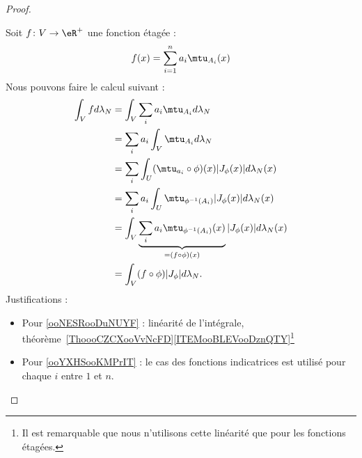 \begin{proof}
\begin{enumerate}
\begin{subproof}
                   Soit \( f\colon V\to \eR^+\) une fonction étagée :
                   \begin{equation}
                       f(x)=\sum_{i=1}^na_i\mtu_{A_i}(x)
                   \end{equation}
                   Nous pouvons faire le calcul suivant :
                   \begin{subequations}
                       \begin{align}
                           \int_Vfd\lambda_N&=\int_V\sum_ia_i\mtu_{A_i}d\lambda_N\\
                           &=\sum_ia_i\int_{V}\mtu_{A_i}d\lambda_N      \label{ooNESRooDuNUYF}\\
                           &=\sum_i\int_U(\mtu_{a_i}\circ\phi)(x)| J_{\phi}(x) |d\lambda_N(x)   \label{ooYXHSooKMPrIT}\\
                           &=\sum_ia_i\int_U\mtu_{\phi^{-1}(A_i)}| J_{\phi}(x) |d\lambda_N(x)\\
                           &=\int_V\underbrace{\sum_ia_i\mtu_{\phi^{-1}(A_i)}(x)}_{=(f\circ\phi)(x)}| J_{\phi}(x) |d\lambda_N(x)\\
                           &=\int_V(f\circ\phi)| J_{\phi} |d\lambda_N.
                       \end{align}
                   \end{subequations}
                   Justifications :
                   \begin{itemize}
                       \item Pour \eqref{ooNESRooDuNUYF} : linéarité de l'intégrale, théorème~\ref{ThoooCZCXooVvNcFD}\ref{ITEMooBLEVooDznQTY}\footnote{Il est remarquable que nous n'utilisons cette linéarité que pour les fonctions étagées.}
                       \item Pour \eqref{ooYXHSooKMPrIT} : le cas des fonctions indicatrices est utilisé pour chaque \( i\) entre \( 1\) et \( n\).
                   \end{itemize}


\end{subproof}
\end{enumerate}
\end{proof}
